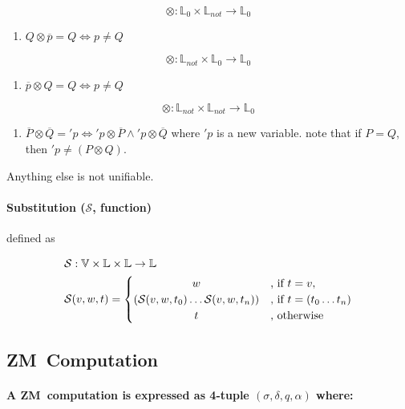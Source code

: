 \documentclass[11pt,a4paper]{report}
\newcommand{\zm}{ZM}
\newcommand{\var}[1]{'#1}
\newcommand{\unify}{\otimes}
\begin{document}
\[
    \unify: \mathbb{L}_{0} \times \mathbb{L}_{not} \rightarrow \mathbb{L}_{0} 
\]

\begin{enumerate}
\item $Q \unify \overline{p} = Q \iff p \neq Q$
\end{enumerate}


\[
    \unify: \mathbb{L}_{not} \times \mathbb{L}_{0} \rightarrow \mathbb{L}_{0} 
\]

\begin{enumerate}
\item $\overline{p} \unify Q = Q \iff p \neq Q$
\end{enumerate}

\[
    \unify: \mathbb{L}_{not} \times \mathbb{L}_{not} \rightarrow \mathbb{L}_{0} 
\]

\begin{enumerate}
\item $\overline{P} \unify \overline{Q} = \var{p} \iff \var{p} \unify \overline{P} \wedge \var{p} \unify \overline{Q}$
    \subitem where $\var{p}$ is a new variable.
    \subitem note that if $P = Q$, then $\var{p} \neq (P \unify Q)$. 
\end{enumerate}

Anything else is not unifiable.

\paragraph{Substitution ($\mathcal{S}$, function)} defined as

\begin{align}
    \mathcal{S}&: \mathbb{V} \times \mathbb{L} \times \mathbb{L} \rightarrow \mathbb{L}\\
    \mathcal{S}&(v, w, t) = 
    \begin{cases}
        \hfill w \hfill &\text{, if } t = v,\\
        \hfill (\mathcal{S}(v, w, t_{0}) \ldots \mathcal{S}(v, w, t_{n})) \hfill & \text{, if } t = (t_{0} \ldots t_{n})\\
        \hfill t \hfill & \text{, otherwise}
    \end{cases}
\end{align}



\subsection{\zm\ Computation}
\paragraph{A \zm\ computation is expressed as 4-tuple $(\sigma, \delta, q, \alpha)$ where:}
\end{document}
